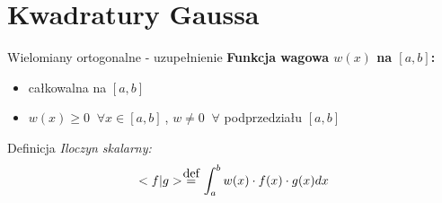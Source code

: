  \section{Kwadratury Gaussa}
\newcommand\myeq{\stackrel{\mathclap{\normalfont\mbox{def}}}{=}}
  \begin{frame}{Wielomiany ortogonalne - uzupełnienie}
      \textbf{Funkcja wagowa $w(x)$ na $[a,b]$:}
      \begin{itemize}
          \item całkowalna na $[a,b]$
          \item $w(x) \geq 0 \ $ $\forall x \in [a,b] \ $,
              $w \neq 0 \ $ $\forall$ podprzedziału $[a,b]$
      \end{itemize}
      \begin{exampleblock}{Definicja}
          \textit{Iloczyn skalarny:}
          \[
              <f | g> \ \myeq  \ \int_{a}^{b} w(x) \cdot f(x) \cdot g(x) dx
          \]
      \end{exampleblock}
  \end{frame}

